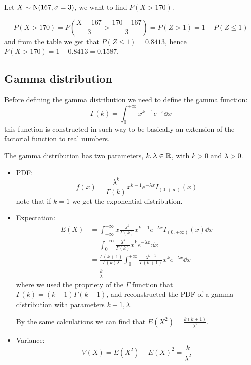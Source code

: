 \documentclass[12pt]{extarticle}
\newcommand{\Normal}{{\operatorfont N}}
\begin{document}
\begin{example}
    Let $X \sim \Normal(167, \sigma = 3)$, we want to find $P(X > 170)$.

    \begin{equation}
        P(X>170) = P(\frac{X - 167}{3} > \frac{170 - 167}{3}) = P(Z > 1) = 1 - P(Z \leq 1)
    \end{equation}
    and from the table we get that $P(Z \leq 1) = 0.8413$, hence $P(X > 170) = 1 - 0.8413 = 0.1587$.
\end{example}

\subsection{Gamma distribution}

Before defining the gamma distribution we need to define the gamma function:
\begin{equation}
    \Gamma(k) = \int_0^{+\infty}x^{k-1}e^{-x} \dd{x}
\end{equation}
this function is constructed in such way to be basically an extension of the factorial function to real numbers.

The gamma distribution has two parameters, $k, \lambda \in \mathbb{R}$, with $k > 0$ and $\lambda > 0$.

\begin{itemize}
    \item PDF:
          \begin{equation}
              f(x) = \frac{\lambda^k}{\Gamma(k)} x^{k-1} e^{-\lambda x} I_{(0, +\infty)}(x)
          \end{equation}
          note that if $k = 1$ we get the exponential distribution.
    \item Expectation:
          \begin{align}
              E(X) & = \int_{-\infty}^{+\infty} x \frac{\lambda^k}{\Gamma(k)} x^{k-1} e^{-\lambda x} I_{(0, +\infty)}(x) \dd{x}               \\
                   & = \int_{0}^{+\infty} \frac{\lambda^k}{\Gamma(k)} x^{k} e^{-\lambda x} \dd{x}                                             \\
                   & = \frac{\Gamma(k+1)}{\Gamma(k) \lambda} \int_{0}^{+\infty} \frac{\lambda^{k+1}}{\Gamma(k+1)} x^{k} e^{-\lambda x} \dd{x} \\
                   & = \frac{k}{\lambda}
          \end{align}
          where we used the propriety of the $\Gamma$ function that $\Gamma(k) = (k-1) \Gamma(k-1)$, and reconstructed the PDF of a gamma distribution with parameters $k+1, \lambda$.

          By the same calculations we can find that $E(X^2) = \frac{k(k+1)}{\lambda^2}$.

    \item Variance:
          \begin{equation}
              V(X) = E(X^2) - E(X)^2 = \frac{k}{\lambda^2}
          \end{equation}
\end{itemize}
\end{document}
